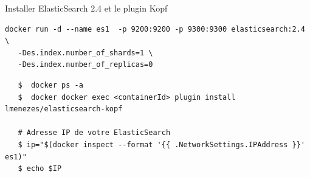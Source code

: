 \begin{frame}[fragile]{Installer ElasticSearch 2.4 et le plugin Kopf}

  \begin{verbatim}
docker run -d --name es1  -p 9200:9200 -p 9300:9300 elasticsearch:2.4 \
   -Des.index.number_of_shards=1 \
   -Des.index.number_of_replicas=0
\end{verbatim} 
\bigskip
  \begin{verbatim}
   $  docker ps -a
   $  docker docker exec <containerId> plugin install lmenezes/elasticsearch-kopf

   # Adresse IP de votre ElasticSearch
   $ ip="$(docker inspect --format '{{ .NetworkSettings.IPAddress }}' es1)"
   $ echo $IP
\end{verbatim} 

\end{frame}

